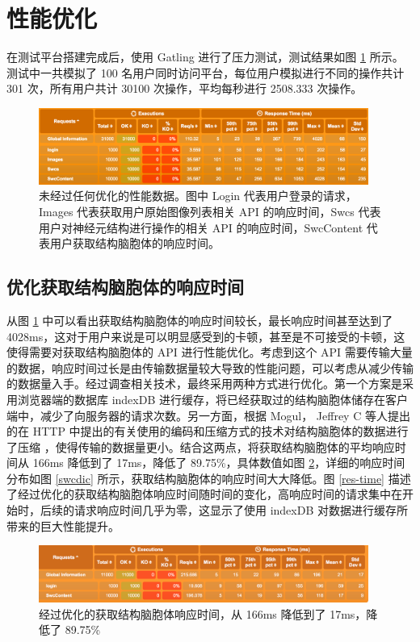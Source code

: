 \section{性能优化}

在测试平台搭建完成后，使用 Gatling 进行了压力测试，测试结果如图 \ref{origin} 所示。测试中一共模拟了 100 名用户同时访问平台，每位用户模拟进行不同的操作共计 301 次，所有用户共计 30100 次操作，平均每秒进行 2508.333 次操作。

\begin{figure}[!ht]
\centering
\includegraphics[width=108mm]{images/origin}
\caption{未经过任何优化的性能数据。图中 Login 代表用户登录的请求， Images 代表获取用户原始图像列表相关 API 的响应时间，Swcs 代表用户对神经元结构进行操作的相关 API 的响应时间，SwcContent 代表用户获取结构脑胞体的响应时间。}
\label{origin}
\end{figure}

\subsection{优化获取结构脑胞体的响应时间}
从图 \ref{origin} 中可以看出获取结构脑胞体的响应时间较长，最长响应时间甚至达到了 4028ms，这对于用户来说是可以明显感受到的卡顿，甚至是不可接受的卡顿，这使得需要对获取结构脑胞体的 API 进行性能优化。考虑到这个 API 需要传输大量的数据，响应时间过长是由传输数据量较大导致的性能问题，可以考虑从减少传输的数据量入手。经过调查相关技术，最终采用两种方式进行优化。第一个方案是采用浏览器端的数据库 indexDB 进行缓存，将已经获取过的结构脑胞体储存在客户端中，减少了向服务器的请求次数。另一方面，根据 Mogul， Jeffrey C 等人提出的在 HTTP 中提出的有关使用的编码和压缩方式的技术对结构脑胞体的数据进行了压缩 ，使得传输的数据量更小。结合这两点，将获取结构脑胞体的平均响应时间从 166ms 降低到了 17ms，降低了 89.75\%，具体数值如图 \ref{swccontent}，详细的响应时间分布如图 \ref{swcdic} 所示，获取结构脑胞体的响应时间大大降低。图 \ref{res-time} 描述了经过优化的获取结构脑胞体响应时间随时间的变化，高响应时间的请求集中在开始时，后续的请求响应时间几乎为零，这显示了使用 indexDB 对数据进行缓存所带来的巨大性能提升。

\begin{figure}[!ht]
\centering
\includegraphics[width=108mm]{images/swccontent}
\caption{经过优化的获取结构脑胞体响应时间，从 166ms 降低到了 17ms，降低了 89.75\%}
\label{swccontent}
\end{figure}

